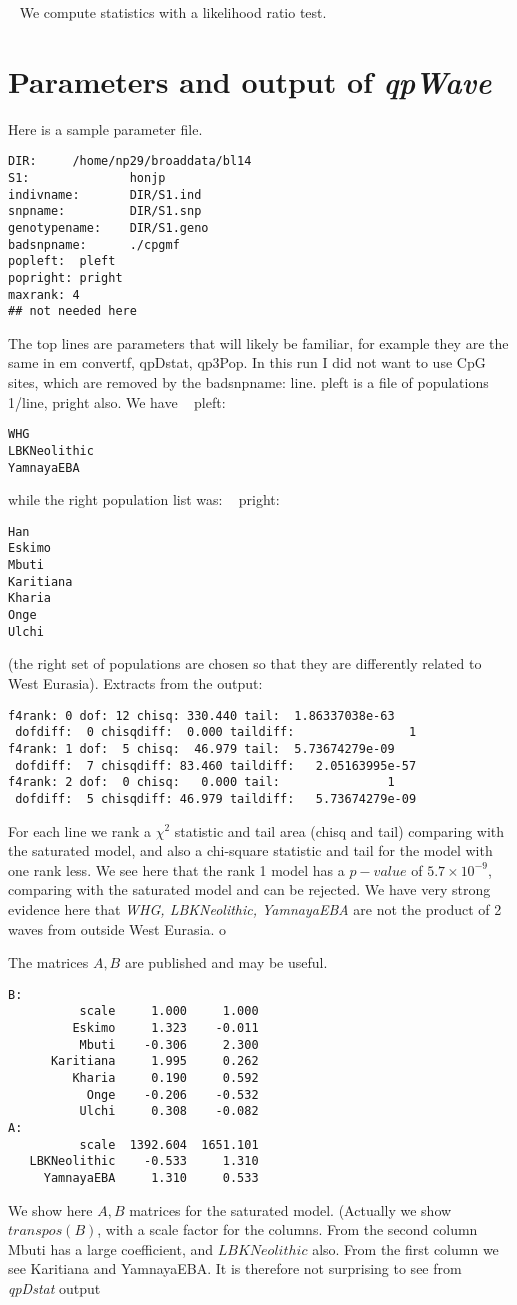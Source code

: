 \documentclass{article} %
\newcommand  {\nld }  {{\ \newline \noindent}}
\newcommand  {\qpw }  {{\em qpWave }}
\begin{document}
\nld
We compute statistics with a likelihood ratio test.   
\section{Parameters and output of \qpw} 
Here is a sample parameter file.  
\begin{verbatim} 
DIR:     /home/np29/broaddata/bl14
S1:              honjp    
indivname:       DIR/S1.ind  
snpname:         DIR/S1.snp       
genotypename:    DIR/S1.geno   
badsnpname:      ./cpgmf
popleft:  pleft   
popright: pright 
maxrank: 4 
## not needed here
\end{verbatim} 
The top lines are parameters that will likely be familiar, 
for example they are the same in {em convertf, qpDstat, qp3Pop}.  
In this run I did not want to use CpG sites, which are removed by the badsnpname: line. 
pleft is a file of populations 1/line, pright also.  We have 
\nld
pleft: 
\begin{verbatim} 
WHG
LBKNeolithic
YamnayaEBA
\end{verbatim}
while the right population list was: 
\nld
pright:
\begin{verbatim} 
Han
Eskimo
Mbuti
Karitiana
Kharia
Onge
Ulchi
\end{verbatim}
(the right set of populations are chosen so that they are differently related to 
West Eurasia).  
Extracts from the output:
\begin{verbatim}
f4rank: 0 dof: 12 chisq: 330.440 tail:  1.86337038e-63 
 dofdiff:  0 chisqdiff:  0.000 taildiff:                1
f4rank: 1 dof:  5 chisq:  46.979 tail:  5.73674279e-09 
 dofdiff:  7 chisqdiff: 83.460 taildiff:   2.05163995e-57 
f4rank: 2 dof:  0 chisq:   0.000 tail:               1 
 dofdiff:  5 chisqdiff: 46.979 taildiff:   5.73674279e-09 
\end{verbatim}
For each line we rank a $\chi^2$ statistic and tail area (chisq and tail) comparing with the saturated model, and also 
a chi-square statistic and tail for the model with one rank less.  
We see here that the rank 1 model has a $p-value$ of $5.7 \times {10}^{-9}$, comparing with the saturated model  and can be rejected. 
We have very strong evidence here that {\em WHG, LBKNeolithic, YamnayaEBA} are not the product of 2 waves from outside West Eurasia. o

The matrices $A, B$ are published and may be useful.
\begin{verbatim}
B:
          scale     1.000     1.000 
         Eskimo     1.323    -0.011 
          Mbuti    -0.306     2.300 
      Karitiana     1.995     0.262 
         Kharia     0.190     0.592 
           Onge    -0.206    -0.532 
          Ulchi     0.308    -0.082 
A:
          scale  1392.604  1651.101 
   LBKNeolithic    -0.533     1.310 
     YamnayaEBA     1.310     0.533 
\end{verbatim}
We show here $A, B$ matrices for the saturated model.  (Actually we show $transpos(B)$, with a scale factor for the columns. 
From the second column  Mbuti has a large coefficient, and $LBKNeolithic$ also.  
From the first column we see Karitiana and YamnayaEBA.  
It is therefore not surprising to see from {\em qpDstat} output
\end{document}
